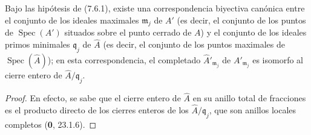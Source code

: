 \begin{corollary}[7.6.2]
\label{IV.2.s7.6.2-fr}
Bajo las hipótesis de \textup{(7.6.1)}, existe una correspondencia biyectiva
canónica entre el conjunto de los ideales maximales $\mathfrak m_j$
de $A'$ \textup{(es decir, el conjunto de los puntos de
$\operatorname{Spec}(A')$ situados sobre el punto cerrado de $A$)} y
el conjunto de los ideales primos minimales $\mathfrak q_j$ de
$\widehat A$ \textup{(es decir, el conjunto de los puntos maximales de
$\operatorname{Spec}(\widehat A)$)}; en esta correspondencia, el
completado $\widehat{A}'_{\mathfrak m_j}$ de $A'_{\mathfrak m_j}$
es isomorfo al cierre entero de $\widehat A/\mathfrak q_j$.
\end{corollary}

\begin{proof}
En efecto, se sabe que el cierre entero de $\widehat A$ en su anillo
total de fracciones es el producto directo de los cierres enteros de
los $\widehat A/\mathfrak q_j$, que son anillos locales completos
(\textbf 0, 23.1.6).
\end{proof}
